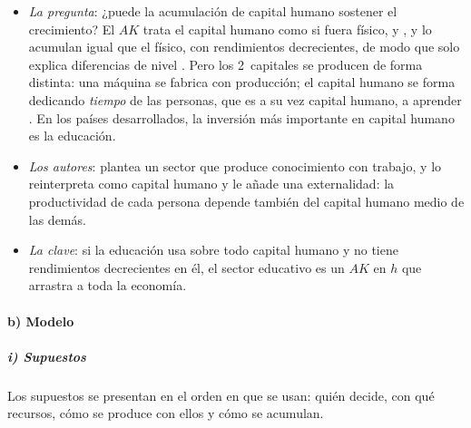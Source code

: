 \documentclass[11pt]{article}
\begin{document}
\begin{itemize}
\item \emph{La pregunta}: ¿puede la acumulación de capital humano sostener el crecimiento? El $AK$ trata el capital humano como si fuera físico, y ,  y  lo acumulan igual que el físico, con rendimientos decrecientes, de modo que solo explica diferencias de nivel . Pero los 2~capitales se producen de forma distinta: una máquina se fabrica con producción; el capital humano se forma dedicando \emph{tiempo} de las personas, que es a su vez capital humano, a aprender . En los países desarrollados, la inversión más importante en capital humano es la educación.
\item \emph{Los autores}: \textcite{Uzawa1965} plantea un sector que produce conocimiento con trabajo, y \textcite{Lucas1988} lo reinterpreta como capital humano y le añade una externalidad: la productividad de cada persona depende también del capital humano medio de las demás.
\item \emph{La clave}: si la educación usa sobre todo capital humano y no tiene rendimientos decrecientes en él, el sector educativo es un $AK$ en $h$ que arrastra a toda la economía.
\end{itemize}

\paragraph{b) Modelo}

\subparagraph{i) Supuestos}

Los supuestos se presentan en el orden en que se usan: quién decide, con qué recursos, cómo se produce con ellos y cómo se acumulan.
\end{document}
